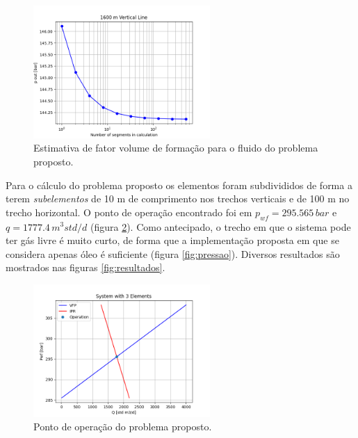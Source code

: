 \documentclass[final,3p]{elsarticle}
\numberwithin{equation}{section}
\begin{document}
        \begin{figure}
          \centering
          \includegraphics[width=0.6\textwidth]{flow/vertical_sensibility.png}
          \caption{Estimativa de fator volume de formação para o fluido do problema proposto.}
          \label{fig:linha_vertical}
        \end{figure}

        Para o cálculo do problema proposto os elementos foram subdivididos de forma a terem \emph{subelementos} de 10 m de comprimento nos trechos verticais e de 100 m no trecho horizontal. O ponto de operação encontrado foi em $p_{wf} = 295.565 \,bar$ e $q = 1777.4 \, m^3 std/d$ (figura \ref{fig:operacao}). Como antecipado, o trecho em que o sistema pode ter gás livre é muito curto, de forma que a implementação proposta em que se considera apenas óleo é suficiente (figura \ref{fig:pressao}). Diversos resultados são mostrados nas figuras \ref{fig:resultados}.

        \begin{figure}
          \centering
          \includegraphics[width=0.6\textwidth]{flow/system1_qp.png}
          \caption{Ponto de operação do problema proposto.}
          \label{fig:operacao}
        \end{figure}
\end{document}
